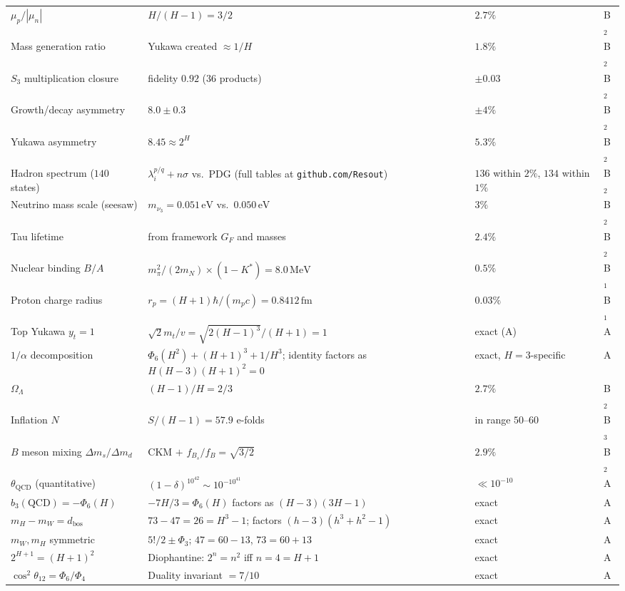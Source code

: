 \documentclass[11pt,a4paper]{article}
\theoremstyle{definition}
\theoremstyle{remark}
\begin{document}
\begin{longtable}{p{3.8cm}p{7.2cm}p{3.0cm}l}
$\mu_p/|\mu_n|$ & $H/(H-1)=3/2$ & $2.7\%$ & B$_2$ \\
Mass generation ratio & Yukawa created $\approx 1/H$ & $1.8\%$ & B$_2$ \\
$S_3$ multiplication closure & fidelity $0.92$ (36 products) & $\pm 0.03$ & B$_2$ \\
Growth/decay asymmetry & $8.0 \pm 0.3$ & $\pm 4\%$ & B$_2$ \\
Yukawa asymmetry & $8.45 \approx 2^H$ & $5.3\%$ & B$_2$ \\
Hadron spectrum ($140$ states) & $\lambda_i^{p/q}+n\sigma$ vs.\ PDG (full tables at \texttt{github.com/Resout}) & $136$ within $2\%$, $134$ within $1\%$ & B$_2$ \\
Neutrino mass scale (seesaw) & $m_{\nu_3}=0.051\,\mathrm{eV}$ vs.\ $0.050\,\mathrm{eV}$ & $3\%$ & B$_2$ \\
Tau lifetime & from framework $G_F$ and masses & $2.4\%$ & B$_2$ \\
Nuclear binding $B/A$ & $m_\pi^2/(2m_N)\times(1-K^*)=8.0\,\mathrm{MeV}$ & $0.5\%$ & B$_1$ \\
Proton charge radius & $r_p=(H+1)\hbar/(m_p c)=0.8412\,\mathrm{fm}$ & $0.03\%$ & B$_1$ \\
Top Yukawa $y_t=1$ & $\sqrt{2}m_t/v=\sqrt{2(H-1)^3}/(H+1)=1$ & exact (A) & A \\
$1/\alpha$ decomposition & $\Phi_6(H^2)+(H+1)^3+1/H^3$; identity factors as $H(H-3)(H+1)^2=0$ & exact, $H\!=\!3$-specific & A \\
$\Omega_\Lambda$ & $(H-1)/H=2/3$ & $2.7\%$ & B$_2$ \\
Inflation $N$ & $S/(H-1)=57.9$ e-folds & in range $50$--$60$ & B$_3$ \\
$B$ meson mixing $\Delta m_s/\Delta m_d$ & CKM $+$ $f_{B_s}/f_B=\sqrt{3/2}$ & $2.9\%$ & B$_2$ \\
$\theta_\mathrm{QCD}$ (quantitative) & $(1-\delta)^{10^{42}}\sim 10^{-10^{41}}$ & $\ll 10^{-10}$ & A \\
$b_3(\mathrm{QCD})=-\Phi_6(H)$ & $-7H/3=\Phi_6(H)$ factors as $(H-3)(3H-1)$ & exact & A \\
$m_H-m_W=d_\mathrm{bos}$ & $73-47=26=H^3-1$; factors $(h-3)(h^3+h^2-1)$ & exact & A \\
$m_W,m_H$ symmetric & $5!/2\pm\Phi_3$; $47=60-13$, $73=60+13$ & exact & A \\
$2^{H+1}=(H+1)^2$ & Diophantine: $2^n=n^2$ iff $n=4=H+1$ & exact & A \\
$\cos^2\theta_{12}=\Phi_6/\Phi_4$ & Duality invariant $=7/10$ & exact & A \\

\end{longtable}
\end{document}
